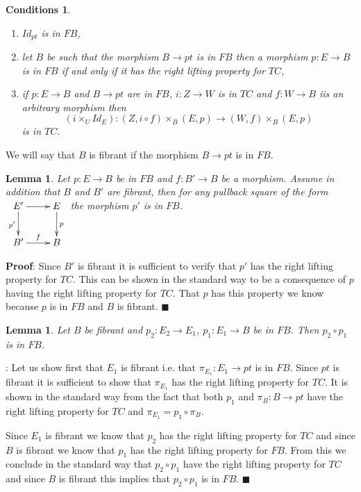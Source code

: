 \documentclass[12pt]{article}
\numberwithin{equation}{section}
\newenvironment{myproof}{{\bf Proof}:}{$\blacksquare$ \vskip 5mm }
\newtheorem{lemma}[proposition]{Lemma}
\newtheorem{cond}[proposition]{Conditions}
\newcommand{\llabel}[1]{\label{#1}}
\newcommand{\sr}{\rightarrow}
\begin{document}
%
\begin{cond}\llabel{2015.05.22.cond1}
%
\begin{enumerate}
\item $Id_{pt}$ is in $FB$,
\item let $B$ be such that the morphism $B\sr pt$ is in $FB$ then a morphism
  $p:E\sr B$ is in $FB$ if and only if it has the right lifting property for
  $TC$,
\item if $p:E\sr B$ and $B\sr pt$ are in $FB$, $i:Z\sr W$ is in $TC$ and
  $f:W\sr B$ iis an arbitrary morphism then
%
$$(i\times_U Id_E):(Z,i\circ f)\times_B (E,p)\sr (W,f)\times_B (E,p)$$
%
is in $TC$.
%
\end{enumerate}
\end{cond}
%
We will say that $B$ is fibrant if the morphism $B\sr pt$ is in $FB$.
%
\begin{lemma}
\llabel{2015.05.14.l2} Let $p:E\sr B$ be in $FB$ and $f:B'\sr B$ be a
morphism. Assume in addition that $B$ and $B'$ are fibrant, then for any
pullback square of the form
%
$
\begin{xy}
          \xymatrix@C=2pc{ E' \ar[r] \ar[d]_{p'} & E \ar[d]^{p}\\ B'
            \ar[r]^-{f} & B }
\end{xy}
$
%
the morphism $p'$ is in $FB$.
\end{lemma}
%
\begin{myproof}
Since $B'$ is fibrant it is sufficient to verify that $p'$ has the right
lifting property for $TC$. This can be shown in the standard way to be a
consequence of $p$ having the right lifting property for $TC$. That $p$ has
this property we know because $p$ is in $FB$ and $B$ is fibrant.
\end{myproof}
%
\begin{lemma}
\llabel{2015.05.14.l4} Let $B$ be fibrant and $p_2:E_2\sr E_1$, $p_1:E_1\sr B$
be in $FB$. Then $p_2\circ p_1$ is in $FB$.
\end{lemma}
%
\begin{myproof}
Let us show first that $E_1$ is fibrant i.e. that $\pi_{E_1}:E_1\sr pt$ is in
$FB$. Since $pt$ is fibrant it is sufficient to show that $\pi_{E_1}$ has the
right lifting property for $TC$. It is shown in the standard way from the fact
that both $p_1$ and $\pi_B:B\sr pt$ have the right lifting property for $TC$
and $\pi_{E_1}=p_1\circ \pi_B$.

Since $E_1$ is fibrant we know that $p_2$ has the right lifting property for
$TC$ and since $B$ is fibrant we know that $p_1$ has the right lifting property
for $FB$. From this we conclude in the standard way that $p_2\circ p_1$ have
the right lifting property for $TC$ and since $B$ is fibrant this implies that
$p_2\circ p_1$ is in $FB$.
\end{myproof}
\end{document}
